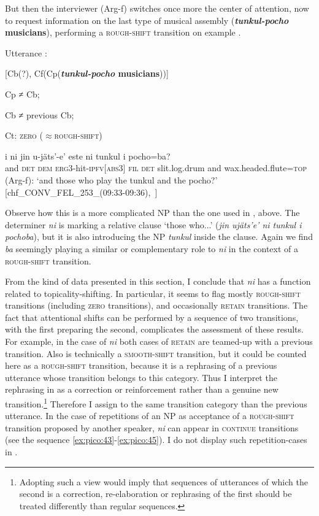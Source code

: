 \documentclass[output=paper
,modfonts
,nonflat]{langsci/langscibook}
\begin{document}
But then the interviewer (Arg-f) switches once more the center of attention, now to request information on the last type of musical assembly (\textbf{\textit{tunkul-pocho} musicians}), performing a \textsc{rough-shift} transition on example . 

\ea
Utterance :

[Cb(?), Cf(Cp(\textbf{\textit{tunkul-pocho} musicians}))]

Cp ≠ Cb;

Cb ≠ previous Cb;

Ct: \textsc{zero ($\approx$rough-shift)}
\z

\ea{}
\label{ex:pico:49}

\gll i ni jin  u-j\"ats'-e' este ni tunkul i pocho=ba?\\
and \textsc{det}  \textsc{dem} \textsc{erg3}-hit-\textsc{ipfv[abs3]} \textsc{fil} \textsc{det} slit.log.drum and wax.headed.flute=\textsc{top}\\
\glt (Arg-f): `and those who play the tunkul and the pocho?' [chf\_CONV\_FEL\_253\_(09:33-09:36),~\citealt{Delgado-Galvan2018archive}]
\z



Observe how this is a more complicated NP than the one used in , above. The determiner \textit{ni} is marking a relative clause `those who...' (\textit{jin  uj\"ats'e' ni tunkul i pochoba}), but it is also introducing the NP \textit{tunkul} inside the clause. Again we find \textit{ba} seemingly playing a similar or complementary role to \textit{ni} in the context of a \textsc{rough-shift} transition.

From the kind of data presented in this section, I conclude that \textit{ni} has a function related to topicality-shifting. In particular, it seems to flag mostly \textsc{rough-shift} transitions (including \textsc{zero} transitions), and occasionally \textsc{retain} transitions. 
The fact that attentional shifts can be performed by a sequence of two transitions, with the first preparing the second, complicates the assessment of these results. For example, in the case of \textit{ni} both cases of \textsc{retain} are teamed-up with a previous transition. 
Also  is technically a \textsc{smooth-shift} transition, but it could be counted here as a \textsc{rough-shift} transition, because it is a rephrasing of a previous utterance whose transition belongs to this category. Thus I interpret the rephrasing in  as a correction or reinforcement rather than a genuine new transition.\footnote{Adopting such a view would imply that sequences of utterances of which the second is a correction, re-elaboration or rephrasing of the first should be treated differently than regular sequences.} Therefore I assign to  the same transition category than the previous utterance. In the case of repetitions of an NP as acceptance of a \textsc{rough-shift} transition proposed by another speaker, \textit{ni} can appear in \textsc{continue} transitions (see the sequence \ref{ex:pico:43}-\ref{ex:pico:45}). I do not display such repetition-cases in .
\end{document}
